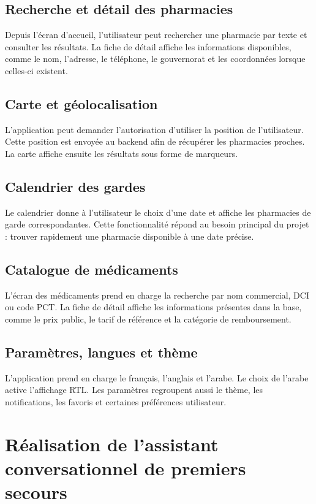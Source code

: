 \subsection{Recherche et détail des pharmacies}

Depuis l'écran d'accueil, l'utilisateur peut rechercher une pharmacie par texte et consulter les résultats.
La fiche de détail affiche les informations disponibles, comme le nom, l'adresse, le téléphone, le
gouvernorat et les coordonnées lorsque celles-ci existent.

\subsection{Carte et géolocalisation}

L'application peut demander l'autorisation d'utiliser la position de l'utilisateur. Cette position est
envoyée au backend afin de récupérer les pharmacies proches. La carte affiche ensuite les résultats sous
forme de marqueurs.

\subsection{Calendrier des gardes}

Le calendrier donne à l'utilisateur le choix d'une date et affiche les pharmacies de garde correspondantes.
Cette fonctionnalité répond au besoin principal du projet : trouver rapidement une pharmacie disponible à
une date précise.

\subsection{Catalogue de médicaments}

L'écran des médicaments prend en charge la recherche par nom commercial, DCI ou code PCT. La fiche de détail
affiche les informations présentes dans la base, comme le prix public, le tarif de référence et la catégorie
de remboursement.

\subsection{Paramètres, langues et thème}

L'application prend en charge le français, l'anglais et l'arabe. Le choix de l'arabe active l'affichage RTL.
Les paramètres regroupent aussi le thème, les notifications, les favoris et certaines préférences
utilisateur.

\section{Réalisation de l'assistant conversationnel de premiers secours}

